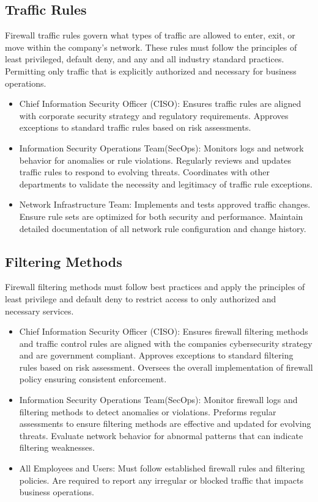     \subsection{Traffic Rules}
    Firewall traffic rules govern what types of traffic are allowed to enter, exit, or move within the company's network. These rules must follow the principles of least privileged, default deny, and any and all industry standard practices. Permitting only traffic that is explicitly authorized and necessary for business operations.
\begin{itemize}
    \item Chief Information Security Officer (CISO): Ensures traffic rules are aligned with corporate security strategy and regulatory requirements. Approves exceptions to standard traffic rules based on risk assessments.
    
    \item Information Security Operations Team(SecOps): Monitors logs and network behavior for anomalies or rule violations. Regularly reviews and updates traffic rules to respond to evolving threats. Coordinates with other departments to validate the necessity and legitimacy of traffic rule exceptions.
    
    \item Network Infrastructure Team: Implements and tests approved traffic changes. Ensure rule sets are optimized for both security and performance. Maintain detailed documentation of all network rule configuration and change history.

    

\end{itemize}
    \subsection{Filtering Methods}
    Firewall filtering methods must follow best practices and apply the principles of least privilege and default deny to restrict access to only authorized and necessary services.
\begin{itemize}
    \item Chief Information Security Officer (CISO): Ensures firewall filtering methods and traffic control rules are aligned with the companies cybersecurity strategy and are government compliant. Approves exceptions to standard filtering rules based on risk assessment. Oversees the overall implementation of firewall policy ensuring consistent enforcement.

    \item Information Security Operations Team(SecOps): Monitor firewall logs and filtering methods to detect anomalies or violations. Preforms regular assessments to ensure filtering methods are effective and updated for evolving threats. Evaluate network behavior for abnormal patterns that can indicate filtering weaknesses.
    
    \item All Employees and Users: Must follow established firewall rules and filtering policies. Are required to report any irregular or blocked traffic that impacts business operations.

\end{itemize}
